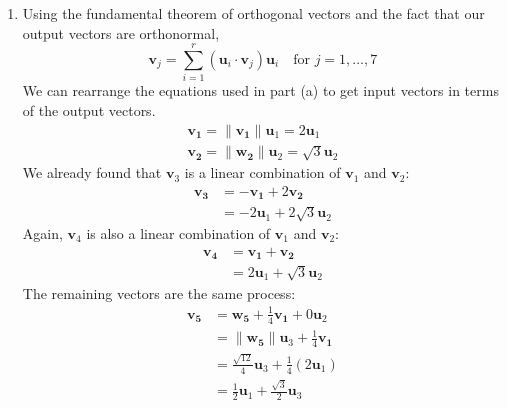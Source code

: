 \documentclass[12pt]{article}
\begin{document}
\begin{enumerate}
\begin{enumerate}
              \item{}
                    Using the fundamental theorem of orthogonal vectors and the fact that our output vectors are orthonormal,
                    \[
                        \mathbf{v}_j = \sum_{i=1}^{r} (\mathbf{u}_i \cdot \mathbf{v}_j) \mathbf{u}_i \quad \text{for } j=1,\ldots,7
                    \]
                    We can rearrange the equations used in part (a) to get input vectors in terms of the output vectors.
                    \begin{align*}
                        \mathbf{v_1} = \|\mathbf{v_1}\|\mathbf{u}_1 = 2\mathbf{u}_1 \\
                        \mathbf{v_2}  = \|\mathbf{w_2}\|\mathbf{u}_2 = \sqrt{3}\mathbf{u}_2
                    \end{align*}
                    We already found that \(\mathbf{v}_3\) is a linear combination of \(\mathbf{v}_1\) and \(\mathbf{v}_2\):
                    \begin{align*}
                        \mathbf{v_3} & = -\mathbf{v_1} + 2\mathbf{v_2}          \\
                                     & = -2\mathbf{u}_1 + 2\sqrt{3}\mathbf{u}_2
                    \end{align*}
                    Again, \(\mathbf{v}_4\) is also a linear combination of \(\mathbf{v}_1\) and \(\mathbf{v}_2\):
                    \begin{align*}
                        \mathbf{v_4} & = \mathbf{v_1} + \mathbf{v_2}          \\
                                     & = 2\mathbf{u}_1 + \sqrt{3}\mathbf{u}_2
                    \end{align*}
                    The remaining vectors are the same process:
                    \begin{align*}
                        \mathbf{v_5} & = \mathbf{w_5} + \tfrac{1}{4}\mathbf{v_1} + 0\mathbf{u}_2                                                                              \\
                                     & = \|\mathbf{w_5}\|\mathbf{u}_3 + \tfrac{1}{4}\mathbf{v_1}                                                                              \\
                                     & = \tfrac{\sqrt{12}}{4}\mathbf{u}_3 + \tfrac{1}{4}(2\mathbf{u}_1)                                                                       \\
                                     & = \tfrac{1}{2}\mathbf{u}_1 + \tfrac{\sqrt{3}}{2}\mathbf{u}_3                                                                           \\

\end{align*}
\end{enumerate}
\end{enumerate}
\end{document}
